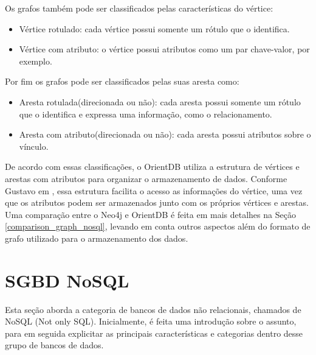 	Os grafos também pode ser classificados pelas características do vértice:
\begin{itemize}
		\item Vértice rotulado: cada vértice possui somente um rótulo que o identifica.
		\item Vértice com atributo: o vértice possui atributos como um par chave-valor, por exemplo.
\end{itemize}

	Por fim os grafos pode ser classificados pelas suas aresta como:
\begin{itemize}
		\item Aresta rotulada(direcionada ou não): cada aresta possui somente um rótulo que o identifica e expressa uma informação, como o relacionamento.
		\item Aresta com atributo(direcionada ou não): cada aresta possui atributos sobre o vínculo.
\end{itemize}

	De acordo com essas classificações, o OrientDB utiliza a estrutura de vértices e arestas com atributos para organizar o armazenamento de dados. Conforme Gustavo em \cite{mdgnosql}, essa estrutura facilita o acesso as informações do vértice, uma vez que os atributos podem ser armazenados junto com os próprios vértices e arestas. Uma comparação entre o Neo4j e OrientDB é feita em mais detalhes na Seção \ref{comparison_graph_nosql}, levando em conta outros aspectos além do formato de grafo utilizado para o armazenamento dos dados.
	
\section{SGBD NoSQL}
	Esta seção aborda a categoria de bancos de dados não relacionais, chamados de NoSQL (Not only SQL). Inicialmente, é feita uma introdução sobre o assunto, para em seguida explicitar as principais características e categorias dentro desse grupo de bancos de dados.
	

